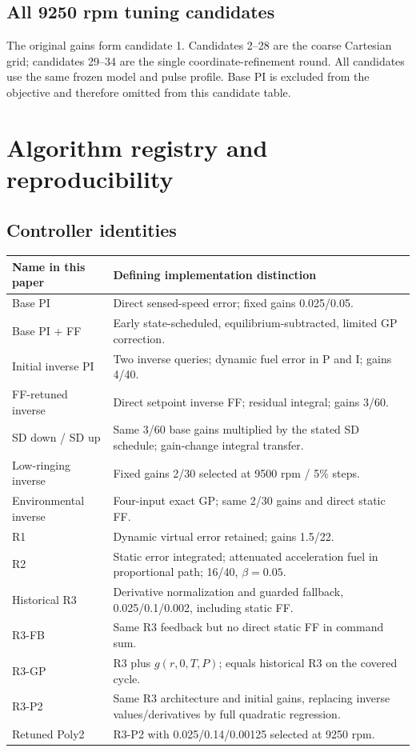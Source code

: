 \documentclass[11pt,a4paper,oneside]{report}
\begin{document}
\section{All 9250 rpm tuning candidates}
The original gains form candidate 1. Candidates 2--28 are the coarse Cartesian grid; candidates 29--34 are the single coordinate-refinement round. All candidates use the same frozen model and pulse profile. Base PI is excluded from the objective and therefore omitted from this candidate table.


\chapter{Algorithm registry and reproducibility}
\label{app:repro}
\section{Controller identities}
\begin{longtable}{@{}p{.24\linewidth}p{.70\linewidth}@{}}
\toprule Name in this paper & Defining implementation distinction\\\midrule\endhead
Base PI & Direct sensed-speed error; fixed gains 0.025/0.05.\\
Base PI + FF & Early state-scheduled, equilibrium-subtracted, limited GP correction.\\
Initial inverse PI & Two inverse queries; dynamic fuel error in P and I; gains 4/40.\\
FF-retuned inverse & Direct setpoint inverse FF; residual integral; gains 3/60.\\
SD down / SD up & Same 3/60 base gains multiplied by the stated SD schedule; gain-change integral transfer.\\
Low-ringing inverse & Fixed gains 2/30 selected at 9500 rpm / 5\% steps.\\
Environmental inverse & Four-input exact GP; same 2/30 gains and direct static FF.\\
R1 & Dynamic virtual error retained; gains 1.5/22.\\
R2 & Static error integrated; attenuated acceleration fuel in proportional path; 16/40, $\beta=0.05$.\\
Historical R3 & Derivative normalization and guarded fallback, 0.025/0.1/0.002, including static FF.\\
R3-FB & Same R3 feedback but no direct static FF in command sum.\\
R3-GP & R3 plus $g(r,0,T,P)$; equals historical R3 on the covered cycle.\\
R3-P2 & Same R3 architecture and initial gains, replacing inverse values/derivatives by full quadratic regression.\\
Retuned Poly2 & R3-P2 with 0.025/0.14/0.00125 selected at 9250 rpm.\\
\bottomrule
\end{longtable}
\end{document}
